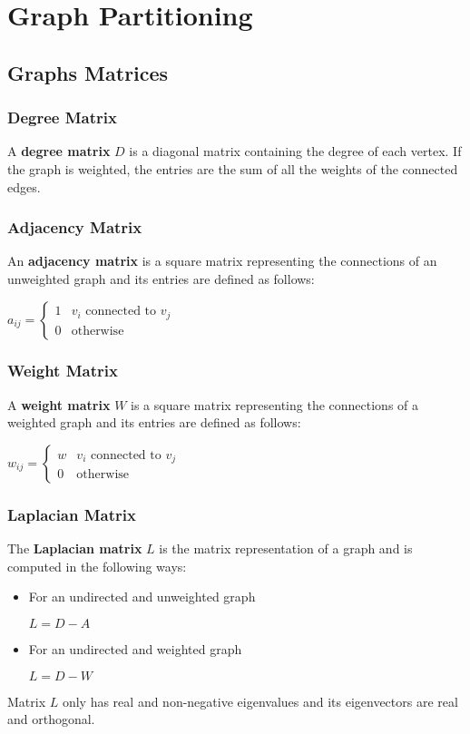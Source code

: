 \documentclass{article}
\begin{document}
\section{Graph Partitioning}
\subsection{Graphs Matrices}
\subsubsection{Degree Matrix}
A \textbf{degree matrix} $D$ is a diagonal matrix containing the degree of each vertex. If the graph is weighted, the entries are the sum of all the weights of the connected edges.
\subsubsection{Adjacency Matrix}
An \textbf{adjacency matrix} is a square matrix representing the connections of an unweighted graph and its entries are defined as follows:
\begin{center}
    $a_{ij} = 
    \begin{cases}
        1 & v_i \text{ connected to } v_j \\
        0 & \text{otherwise}
    \end{cases}$
\end{center}
\subsubsection{Weight Matrix}
A \textbf{weight matrix} $W$ is a square matrix representing the connections of a weighted graph and its entries are defined as follows:
\begin{center}
    $w_{ij} = 
    \begin{cases}
        w & v_i \text{ connected to } v_j \\
        0 & \text{otherwise}
    \end{cases}$
\end{center}
\subsubsection{Laplacian Matrix}
The \textbf{Laplacian matrix} $L$ is the matrix representation of a graph and is computed in the following ways:
\begin{itemize}
    \item For an undirected and unweighted graph
        \begin{center}
            $L = D - A $
        \end{center}
    \item For an undirected and weighted graph
        \begin{center}
            $L = D - W $
        \end{center}
\end{itemize}
Matrix $L$ only has real and non-negative eigenvalues and its eigenvectors are real and orthogonal.
\end{document}
